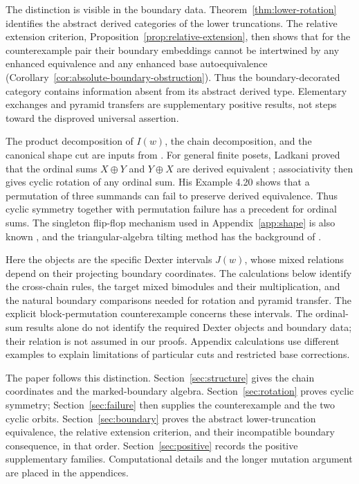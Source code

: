 \documentclass[11pt]{article}
\theoremstyle{definition}
\begin{document}
The distinction is visible in the boundary data. Theorem~\ref{thm:lower-rotation}
identifies the abstract derived categories of the lower truncations.
The relative extension criterion, Proposition~\ref{prop:relative-extension},
then shows that for the counterexample pair their boundary embeddings
cannot be intertwined by any enhanced equivalence and any enhanced
base autoequivalence (Corollary~\ref{cor:absolute-boundary-obstruction}).
Thus the boundary-decorated category contains information absent from
its abstract derived type. Elementary exchanges and pyramid transfers
are supplementary positive results, not steps toward the disproved
universal assertion.

The product decomposition of $I(w)$, the chain decomposition, and the
canonical shape cut are inputs from \cite[Proposition 4.4 and Section 5.2]{Chapoton}.
For general finite posets, Ladkani proved that the ordinal sums
$X\oplus Y$ and $Y\oplus X$ are derived equivalent
\cite[Corollary 4.15]{LadkaniSheaves}; associativity then gives cyclic
rotation of any ordinal sum. His Example 4.20 shows that a permutation
of three summands can fail to preserve derived equivalence.
Thus cyclic symmetry together with permutation failure has a precedent
for ordinal sums. The singleton flip-flop mechanism used in
Appendix~\ref{app:shape} is also known
\cite[Corollary 1.3]{LadkaniPosets}, and the triangular-algebra tilting
method has the background of \cite[Theorems 4.5 and 4.9]{LadkaniTriangular}.

Here the objects are the specific Dexter intervals $J(w)$, whose
mixed relations depend on their projecting boundary coordinates.
The calculations below identify the cross-chain rules, the target
mixed bimodules and their multiplication, and the natural boundary
comparisons needed for rotation and pyramid transfer. The explicit
block-permutation counterexample concerns these intervals.
The ordinal-sum results alone do not identify the required Dexter
objects and boundary data; their relation is not assumed in our proofs.
Appendix calculations use different examples to explain limitations
of particular cuts and restricted base corrections.

The paper follows this distinction. Section~\ref{sec:structure} gives
the chain coordinates and the marked-boundary algebra.
Section~\ref{sec:rotation} proves cyclic symmetry; Section~\ref{sec:failure}
then supplies the counterexample and the two cyclic orbits.
Section~\ref{sec:boundary} proves the abstract lower-truncation
equivalence, the relative extension criterion, and their incompatible
boundary consequence, in that order. Section~\ref{sec:positive}
records the positive supplementary families. Computational details
and the longer mutation argument are placed in the appendices.
\end{document}
